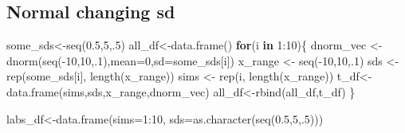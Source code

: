 \documentclass[
  letterpaper,
  DIV=11,
  numbers=noendperiod]{scrreprt}
\newenvironment{Shaded}{\begin{snugshade}}{\end{snugshade}}
\newcommand{\AttributeTok}[1]{\textcolor[rgb]{0.40,0.45,0.13}{#1}}
\newcommand{\ControlFlowTok}[1]{\textcolor[rgb]{0.00,0.23,0.31}{\textbf{#1}}}
\newcommand{\DecValTok}[1]{\textcolor[rgb]{0.68,0.00,0.00}{#1}}
\newcommand{\FloatTok}[1]{\textcolor[rgb]{0.68,0.00,0.00}{#1}}
\newcommand{\FunctionTok}[1]{\textcolor[rgb]{0.28,0.35,0.67}{#1}}
\newcommand{\NormalTok}[1]{\textcolor[rgb]{0.00,0.23,0.31}{#1}}
\newcommand{\OtherTok}[1]{\textcolor[rgb]{0.00,0.23,0.31}{#1}}
\newcommand{\SpecialCharTok}[1]{\textcolor[rgb]{0.37,0.37,0.37}{#1}}
\begin{document}
\subsection{Normal changing sd}\label{normal-changing-sd}

\begin{Shaded}
\begin{Highlighting}[]
\NormalTok{some\_sds}\OtherTok{\textless{}{-}}\FunctionTok{seq}\NormalTok{(}\FloatTok{0.5}\NormalTok{,}\DecValTok{5}\NormalTok{,.}\DecValTok{5}\NormalTok{)}
\NormalTok{all\_df}\OtherTok{\textless{}{-}}\FunctionTok{data.frame}\NormalTok{()}
\ControlFlowTok{for}\NormalTok{(i }\ControlFlowTok{in} \DecValTok{1}\SpecialCharTok{:}\DecValTok{10}\NormalTok{)\{}
\NormalTok{  dnorm\_vec }\OtherTok{\textless{}{-}} \FunctionTok{dnorm}\NormalTok{(}\FunctionTok{seq}\NormalTok{(}\SpecialCharTok{{-}}\DecValTok{10}\NormalTok{,}\DecValTok{10}\NormalTok{,.}\DecValTok{1}\NormalTok{),}\AttributeTok{mean=}\DecValTok{0}\NormalTok{,}\AttributeTok{sd=}\NormalTok{some\_sds[i])}
\NormalTok{  x\_range   }\OtherTok{\textless{}{-}} \FunctionTok{seq}\NormalTok{(}\SpecialCharTok{{-}}\DecValTok{10}\NormalTok{,}\DecValTok{10}\NormalTok{,.}\DecValTok{1}\NormalTok{)}
\NormalTok{  sds }\OtherTok{\textless{}{-}} \FunctionTok{rep}\NormalTok{(some\_sds[i], }\FunctionTok{length}\NormalTok{(x\_range))}
\NormalTok{  sims }\OtherTok{\textless{}{-}} \FunctionTok{rep}\NormalTok{(i, }\FunctionTok{length}\NormalTok{(x\_range))}
\NormalTok{  t\_df}\OtherTok{\textless{}{-}}\FunctionTok{data.frame}\NormalTok{(sims,sds,x\_range,dnorm\_vec)}
\NormalTok{  all\_df}\OtherTok{\textless{}{-}}\FunctionTok{rbind}\NormalTok{(all\_df,t\_df)}
\NormalTok{\}}

\NormalTok{labs\_df}\OtherTok{\textless{}{-}}\FunctionTok{data.frame}\NormalTok{(}\AttributeTok{sims=}\DecValTok{1}\SpecialCharTok{:}\DecValTok{10}\NormalTok{,}
                    \AttributeTok{sds=}\FunctionTok{as.character}\NormalTok{(}\FunctionTok{seq}\NormalTok{(}\FloatTok{0.5}\NormalTok{,}\DecValTok{5}\NormalTok{,.}\DecValTok{5}\NormalTok{)))}


\end{Highlighting}
\end{Shaded}
\end{document}
